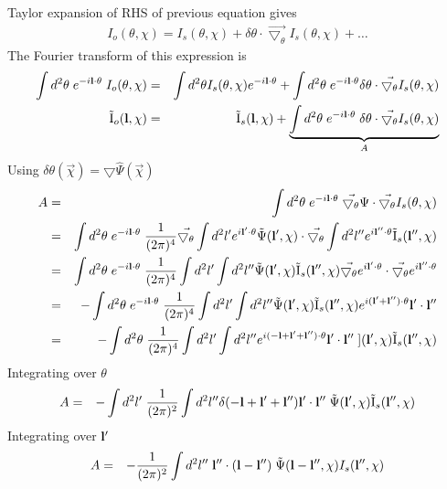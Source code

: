 \documentclass[12pt]{article}
\newcommand{\beqa}{\begin{eqnarray}}
\newcommand{\eeqa}{\end{eqnarray}}
\def\l{{\bf l}}
\def\iul{{\rm I}}
\def\il{{\tilde{\rm I}}}
\def\dtheta{\delta \theta}
\numberwithin{equation}{section}
\begin{document}
Taylor expansion of RHS of previous equation gives
\beqa
I_o(\theta,\chi) = I_s(\theta,\chi) + \delta\theta \cdot \vec{\bigtriangledown_\theta} I_s(\theta,\chi) + \ldots
\eeqa
The Fourier transform of this expression is
\begin{eqnarray}
\int d^2 \theta \; e^{-i \l \cdot \theta} \; I_o(\theta,\chi) &=& \int d^2 \theta I_s(\theta,\chi) e^{-i \l \cdot \theta} + \int d^2 \theta \; e^{-i\l \cdot \theta} \delta\theta \cdot \vec{\bigtriangledown_\theta} I_s(\theta,\chi)\nonumber\\
\il_o(\l,\chi) &=& \il_s(\l,\chi) + \underbrace{\int d^2 \theta \; e^{-i\l \cdot \theta} \; \delta\theta \cdot \vec{\bigtriangledown_\theta} I_s(\theta,\chi)}_{A}
\end{eqnarray}
Using $\dtheta(\vec{\chi})=\bigtriangledown \hat{\Psi}(\vec{\chi})$
\begin{eqnarray}
A &= & \int d^2 \theta \; e^{-i\l \cdot \theta} \; \vec{\bigtriangledown_\theta} \Psi \cdot \vec{\bigtriangledown_\theta} I_s(\theta,\chi) \\
&= & \int d^2 \theta \; e^{-i\l \cdot \theta} \; \frac{1}{(2\pi)^4}  \vec{\bigtriangledown_\theta} \int d^2 l'  e^{i\l' \cdot \theta} \tilde{\Psi}(\l', \chi) \cdot \vec{\bigtriangledown_\theta} \int d^2 l''  e^{i\l'' \cdot \theta} \il_s(\l'',\chi)  \\
&= & \int d^2 \theta \; e^{-i\l \cdot \theta} \; \frac{1}{(2\pi)^4}  \int d^2 l' \int d^2 l''  \tilde{\Psi}(\l', \chi) \il_s(\l'',\chi) \vec{\bigtriangledown_\theta} e^{i\l' \cdot \theta}  \cdot  \vec{\bigtriangledown_\theta}  e^{i\l'' \cdot \theta}   \\
&= & - \int d^2 \theta \; e^{-i\l \cdot \theta} \;  \frac{1}{(2\pi)^4}  \int d^2 l' \int d^2 l''  \tilde{\Psi}(\l', \chi) \il_s(\l'',\chi) e^{i(\l' + \l'') \cdot \theta} \l' \cdot \l''\\
&= & -\int d^2 \theta \; \frac{1}{(2\pi)^4}  \int d^2 l' \int d^2 l''  e^{i(-\l + \l' + \l'') \cdot \theta} \l' \cdot \l'' \; ](\l', \chi) \il_s(\l'',\chi)
\end{eqnarray}
Integrating over $ \theta $
\begin{eqnarray}
A &= &- \int d^2 l' \; \frac{1}{(2\pi)^2}  \int d^2 l'' \delta(-\l + \l' + \l'') \l' \cdot \l'' \; \tilde{\Psi}(\l', \chi) \il_s(\l'',\chi)
\end{eqnarray}
Integrating over $ \l' $
\begin{eqnarray}
A &= &- \frac{1}{(2\pi)^2} \int d^2 l'' \;  \l'' \cdot (\l - \l'') \; \tilde{\Psi}(\l - \l'', \chi) I_s(\l'',\chi)
\end{eqnarray}
\end{document}
